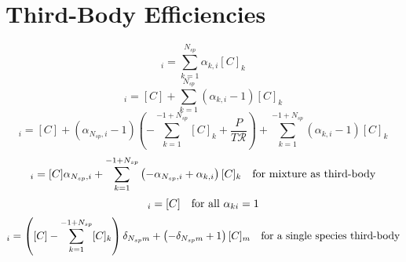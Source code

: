 \documentclass[a4paper,10pt]{article}
\newcommand{\ns}{N_{sp}}
\newcommand{\Ru}{\mathcal{R}}
\begin{document}
\section{Third-Body Efficiencies}
\begin{dmath} [X]_{i} = \sum_{k=1}^{\ns} \alpha_{k,i} [C]_{k}\end{dmath} 
\begin{dmath} [X]_{i} = [C] + \sum_{k=1}^{\ns} \left(\alpha_{k,i} - 1\right) [C]_{k}\end{dmath} 
\begin{dmath} [X]_{i} = [C] + \left(\alpha_{\ns,i} - 1\right) \left(- \sum_{k=1}^{-1 + \ns} [C]_{k} + \frac{P}{T \Ru}\right) + \sum_{k=1}^{-1 + \ns} \left(\alpha_{k,i} - 1\right) [C]_{k}\end{dmath} 
\begin{dmath} [X]_{i}=[C] \alpha_{\ns,i} + \sum_{k=1}^{-1 + \ns} \left(- \alpha_{\ns,i} + \alpha_{k,i}\right) [C]_{k}\text{\quad for mixture as third-body}\end{dmath} 
\begin{dmath} [X]_{i}=[C]\text{\quad for all $\alpha_{ki} = 1$}\end{dmath} 
\begin{dmath} [X]_{i}=\left([C] - \sum_{k=1}^{-1 + \ns} [C]_{k}\right) \delta_{\ns m} + \left(- \delta_{\ns m} + 1\right) [C]_{m}\text{\quad for a single species third-body}\end{dmath} 
\end{document}
